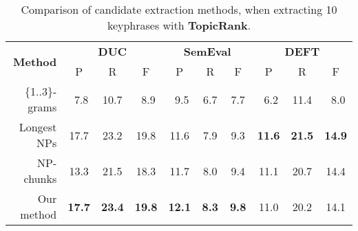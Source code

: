       \begin{table}
        \centering
        \begin{tabular}{rccccccccc}
          \toprule
          \multirow{2}{*}[-2pt]{\textbf{Method}} & \multicolumn{3}{c}{\textbf{DUC}} & \multicolumn{3}{c}{\textbf{SemEval}} & \multicolumn{3}{c}{\textbf{DEFT}}\\
          \cmidrule(r){2-4}\cmidrule(lr){5-7}\cmidrule(l){8-10}
          & P & R & F & P & R & F & P & R & F\\
          \midrule
          \{1..3\}-grams & $~~$7.8 & 10.7 & $~~$8.9 & $~~$9.5 & $~~$6.7 & $~~$7.7 & $~~$6.2 & 11.4 & $~~$8.0\\
          Longest NPs & 17.7 & 23.2 & 19.8 & 11.6 & $~~$7.9 & $~~$9.3 & \textbf{11.6} & \textbf{21.5} & \textbf{14.9}\\
          NP-chunks & 13.3 & 21.5 & 18.3 & 11.7 & $~~$8.0 & $~~$9.4 & 11.1 & 20.7 & 14.4\\
          Our method & \textbf{17.7} & \textbf{23.4} & \textbf{19.8} & \textbf{12.1} & \textbf{$~~$8.3} & \textbf{$~~$9.8} & 11.0 & 20.2 & 14.1\\
          \bottomrule
        \end{tabular}
        \caption{Comparison of candidate extraction methods, when extracting 10
                 keyphrases with \textbf{TopicRank}.
                 \label{tab:topicrank_results}}
      \end{table}
